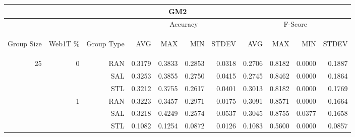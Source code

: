 \begin{center}
\begin{table}[htbp]
\begin{tabular}{ | r | r | r | r | r | r | r | r | r | r | r |}
\hline
\multicolumn{11}{|c|}{GM2}\\
\hline
 & & & \multicolumn{4}{|c|}{Accuracy} & \multicolumn{4}{|c|}{F-Score}\\ \cline{4-11}
\begin{sideways}Group Size\end{sideways} & \begin{sideways}Web1T \%\end{sideways} & \begin{sideways}Group Type\end{sideways} & \begin{sideways}AVG\end{sideways} & \begin{sideways}MAX\end{sideways} & \begin{sideways}MIN\end{sideways} & \begin{sideways}STDEV\end{sideways} & \begin{sideways}AVG\end{sideways} & \begin{sideways}MAX\end{sideways} & \begin{sideways}MIN\end{sideways} & \begin{sideways}STDEV\end{sideways}\\
\hline
\multirow{18}{*}{25}
 & \multirow{3}{*}{0} & RAN & 0.3179 & 0.3833 & 0.2853 & 0.0318 & 0.2706 & 0.8182 & 0.0000 & 0.1887\\ \cline{3-11}
 &   & SAL & 0.3253 & 0.3855 & 0.2750 & 0.0415 & 0.2745 & 0.8462 & 0.0000 & 0.1864\\ \cline{3-11}
 &   & STL & 0.3212 & 0.3755 & 0.2617 & 0.0401 & 0.3013 & 0.8182 & 0.0000 & 0.1769\\ \cline{2-11}
 & \multirow{3}{*}{1} & RAN & 0.3223 & 0.3457 & 0.2971 & 0.0175 & 0.3091 & 0.8571 & 0.0000 & 0.1664\\ \cline{3-11}
 &   & SAL & 0.3218 & 0.4249 & 0.2574 & 0.0537 & 0.3045 & 0.8755 & 0.0377 & 0.1658\\ \cline{3-11}
 &   & STL & 0.1082 & 0.1254 & 0.0872 & 0.0126 & 0.1083 & 0.5600 & 0.0000 & 0.0857\\ \cline{2-11}

\end{tabular}
\end{table}
\end{center}
